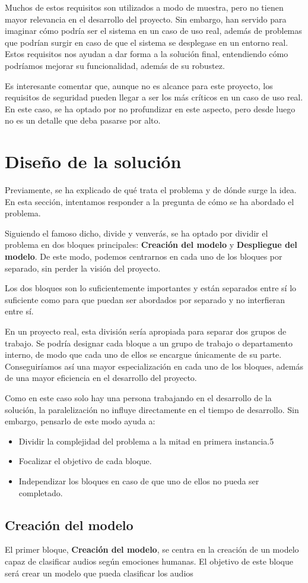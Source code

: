 Muchos de estos requisitos son utilizados a modo de muestra, pero no tienen mayor relevancia en el desarrollo del proyecto.
Sin embargo, han servido para imaginar cómo podría ser el sistema en un caso de uso real, además de problemas que podrían surgir en caso de que el sistema se desplegase en un entorno real.
Estos requisitos nos ayudan a dar forma a la solución final, entendiendo cómo podríamos mejorar su funcionalidad, además de su robustez.

Es interesante comentar que, aunque no es alcance para este proyecto, los requisitos de seguridad pueden llegar a ser los más críticos en un caso de uso real.
En este caso, se ha optado por no profundizar en este aspecto, pero desde luego no es un detalle que deba pasarse por alto.



\section{Diseño de la solución}\label{sec:diseno}

Previamente, se ha explicado de qué trata el problema y de dónde surge la idea.
En esta sección, intentamos responder a la pregunta de cómo se ha abordado el problema.

Siguiendo el famoso dicho, divide y venverás, se ha optado por dividir el problema en dos bloques principales: \textbf{Creación del modelo} y \textbf{Despliegue del modelo}.
De este modo, podemos centrarnos en cada uno de los bloques por separado, sin perder la visión del proyecto.

Los dos bloques son lo suficientemente importantes y están separados entre sí lo suficiente como para que puedan ser abordados por separado y no interfieran entre sí.

En un proyecto real, esta división sería apropiada para separar dos grupos de trabajo.
Se podría designar cada bloque a un grupo de trabajo o departamento interno, de modo que cada uno de ellos se encargue únicamente de su parte.
Conseguiríamos así una mayor especialización en cada uno de los bloques, además de una mayor eficiencia en el desarrollo del proyecto.

Como en este caso solo hay una persona trabajando en el desarrollo de la solución, la paralelización no influye directamente en el tiempo de desarrollo.
Sin embargo, pensarlo de este modo ayuda a:

\begin{itemize}\itemsep1pt \parskip0pt 
    \item Dividir la complejidad del problema a la mitad en primera instancia.5
    \item Focalizar el objetivo de cada bloque.
    \item Independizar los bloques en caso de que uno de ellos no pueda ser completado.
\end{itemize}

\subsection{Creación del modelo}\label{sec:diseno-modelo}

El primer bloque, \textbf{Creación del modelo}, se centra en la creación de un modelo capaz de clasificar audios según emociones humanas.
El objetivo de este bloque será crear un modelo que pueda clasificar los audios 



\endinput
